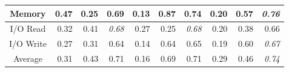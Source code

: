 \begin{table*}
\begin{tabular}{|c|r|r|r|r|r|r|r|r|r|}
Memory            & 0.47  & 0.25    & 0.69 & 0.13  & 0.87    & 0.74 & 0.20  & 0.57    & \textit{0.76}            \\ \hline
I/O Read          & 0.32  & 0.41    & \textit{0.68}            & 0.27  & 0.25    & \textit{0.68}            & 0.20  & 0.38    & 0.66 \\ \hline
I/O Write         & 0.27  & 0.31    & 0.64 & 0.14  & 0.64    & 0.65 & 0.19  & 0.60    & \textit{0.67}            \\ \hline
Average           & 0.31  & 0.43    & 0.71 & 0.16  & 0.69    & 0.71 & 0.29  & 0.46    & \textit{0.74}            \\ \hline
\end{tabular}

\label{tab:model_evaluation_hadoop}
\end{table*}




